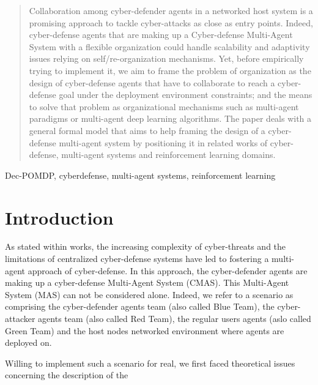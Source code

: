 \documentclass[conference]{IEEEtran}
\begin{document}
\maketitle

\begin{abstract}

Collaboration among cyber-defender agents in a networked host system is a promising approach to tackle cyber-attacks as close as entry points. Indeed, cyber-defense agents that are making up a Cyber-defense Multi-Agent System with a flexible organization could handle scalability and adaptivity issues relying on self/re-organization mechanisms. Yet, before empirically trying to implement it, we aim to frame the problem of organization as the design of cyber-defense agents that have to collaborate to reach a cyber-defense goal under the deployment environment constraints; and the means to solve that problem as organizational mechanisms such as multi-agent paradigms or multi-agent deep learning algorithms.
The paper deals with a general formal model that aims to help framing the design of a cyber-defense multi-agent system by positioning it in related works of cyber-defense, multi-agent systems and reinforcement learning domains.

\end{abstract}

\begin{IEEEkeywords}
Dec-POMDP, cyberdefense, multi-agent systems, reinforcement learning
\end{IEEEkeywords}

\section{Introduction}

As stated within  works\cite{kott2023autonomous}, the increasing complexity of cyber-threats and the limitations of centralized cyber-defense systems have led to fostering a multi-agent approach of cyber-defense. In this approach, the cyber-defender agents are making up a cyber-defense Multi-Agent System (CMAS). This Multi-Agent System (MAS) can not be considered alone. Indeed, we refer to a scenario as comprising the cyber-defender agents team (also called Blue Team), the cyber-attacker agents team (also called Red Team), the regular users agents (aslo called Green Team) and the host nodes networked environment where agents are deployed on.

Willing to implement such a scenario for real, we first faced theoretical issues concerning the description of the 
\end{document}
